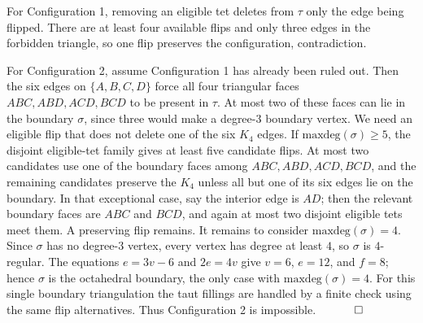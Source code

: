 \documentclass[12pt]{article}
\newcommand{\proofend}{$\quad \qed$}
\newcommand{\kw}{\mathrm}
\newcommand{\maxdeg}{\kw{maxdeg}}
\begin{document}
For Configuration 1, removing an eligible tet deletes from $\tau$ only
the edge being flipped.  There are at least four available flips and only
three edges in the forbidden triangle, so one flip preserves the
configuration, contradiction.

For Configuration 2, assume Configuration 1 has already been ruled out.
Then the six edges on $\{A,B,C,D\}$ force all four triangular faces
$ABC,ABD,ACD,BCD$ to be present in $\tau$.
At most two of these faces can lie in the boundary $\sigma$, since three
would make a degree-$3$ boundary vertex.
We need an eligible flip that does not delete one of the six $K_4$ edges.
If $\maxdeg(\sigma)\geq 5$, the disjoint eligible-tet family gives at
least five candidate flips.  At most two candidates use one of the
boundary faces among $ABC,ABD,ACD,BCD$, and the remaining candidates
preserve the $K_4$ unless all but one of its six edges lie on the
boundary.  In that exceptional case, say the interior edge is $AD$;
then the relevant boundary faces are $ABC$ and $BCD$, and again at most
two disjoint eligible tets meet them.  A preserving flip remains.
It remains to consider $\maxdeg(\sigma)=4$.
Since $\sigma$ has no degree-$3$ vertex, every vertex has degree at least
$4$, so $\sigma$ is $4$-regular.  The equations
$e=3v-6$ and $2e=4v$ give $v=6$, $e=12$, and $f=8$; hence $\sigma$ is
the octahedral boundary, the only case with $\maxdeg(\sigma)=4$.
For this single boundary triangulation the taut fillings are handled by
a finite check using the same flip alternatives.
Thus Configuration 2 is impossible.
\proofend



\end{document}
